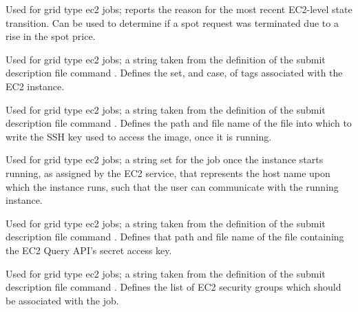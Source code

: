 \begin{description}
\item[\AdAttr{EC2StatusReasonCode}:] 
Used for grid type ec2 jobs;
reports the reason for the most recent EC2-level state transition.
Can be used to determine if a spot request was terminated
due to a rise in the spot price.

\item[\AdAttr{EC2TagNames}:] 
Used for grid type ec2 jobs;
a string taken from the definition of the submit description file command
.
Defines the set, and case, of tags associated with the EC2 instance. 

\item[\AdAttr{EC2KeyPairFile}:] 
Used for grid type ec2 jobs;
a string taken from the definition of the submit description file command
.
Defines the path and file name of the file 
into which to write the SSH key used to access the image, once it is running. 

\item[\AdAttr{EC2RemoteVirtualMachineName}:] 
Used for grid type ec2 jobs;
a string set for the job once the instance starts running, 
as assigned by the EC2 service, that represents
the host name upon which the instance runs, such that the
user can communicate with the running instance.

\item[\AdAttr{EC2SecretAccessKey}:] 
Used for grid type ec2 jobs;
a string taken from the definition of the submit description file command
.
Defines that path and file name of the file 
containing the EC2 Query API's secret access key.

\item[\AdAttr{EC2SecurityGroups}:] 
Used for grid type ec2 jobs;
a string taken from the definition of the submit description file command
.
Defines the list of EC2 security groups which should be associated with the job.


\end{description}
